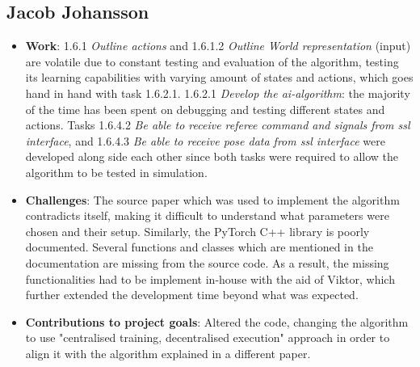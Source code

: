 \subsection*{Jacob Johansson}
\begin{itemize}
    \item \textbf{Work}: 1.6.1 \textit{Outline actions} and 1.6.1.2 \textit{Outline World representation} (input) are volatile due to constant testing and evaluation of the algorithm, testing its learning capabilities with varying amount of states and actions, which goes hand in hand with task 1.6.2.1. 1.6.2.1 \textit{Develop the \acs{ai}-algorithm}: the majority of the time has been spent on debugging and testing different states and actions. Tasks 1.6.4.2 \textit{Be able to receive referee command and signals from \acs{ssl} interface}, and 1.6.4.3 \textit{Be able to receive pose data from \acs{ssl} interface} were developed along side each other since both tasks were required to allow the algorithm to be tested in simulation.
    \item \textbf{Challenges}: The source paper which was used to implement the algorithm contradicts itself, making it difficult to understand what parameters were chosen and their setup. Similarly, the PyTorch C++ library is poorly documented. Several functions and classes which are mentioned in the documentation are missing from the source code. As a result, the missing functionalities had to be implement in-house with the aid of Viktor, which further extended the development time beyond what was expected.
    \item \textbf{Contributions to project goals}: Altered the code, changing the algorithm to use "centralised training, decentralised execution" approach in order to align it with the algorithm explained in a different paper.
\end{itemize}
